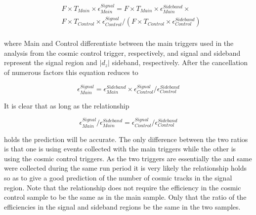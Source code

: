 \begin{equation}
\begin{split}
& F \times T_{Main} \times \epsilon_{Main}^{Signal} = F \times T_{Main} \times \epsilon_{Main}^{Sideband} \times \\
& F \times T_{Control} \times \epsilon_{Control}^{Signal} / (F \times T_{Control} \times \epsilon_{Control}^{Sideband}) \\
\end{split}
\label{eq:CosmicPred}
\end{equation}

where Main and Control differentiate between the main triggers used in the analysis from the cosmic control trigger, respectively,
 and signal and sideband represent the signal region and $|d_z|$ sideband, respectively. After the cancellation of numerous factors this equation reduces to 

\begin{equation}
\epsilon_{Main}^{Signal} = \epsilon_{Main}^{Sideband} \times \epsilon_{Control}^{Signal} / \epsilon_{Control}^{Sideband}
\label{eq:ReducedCosmicPred}
\end{equation}

It is clear that as long as the relationship

\begin{equation}
\epsilon_{Main}^{Signal}/ \epsilon_{Main}^{Sideband} = \epsilon_{Control}^{Signal} / \epsilon_{Control}^{Sideband}
\label{eq:ReducedCosmicPred}
\end{equation}

holds the prediction will be accurate. The only difference between the two ratios is that one is using events collected with the main triggers while the
other is using the cosmic control triggers. As the two triggers are essentially the and same were collected during the same run period it is very likely the
relationship holds so as to give a good prediction of the number of cosmic tracks in the signal region. Note that the relationship does not require the efficiency
in the cosmic control sample to be the same as in the main sample. Only that the ratio of the efficiencies in the signal and sideband regions
be the same in the two samples.


